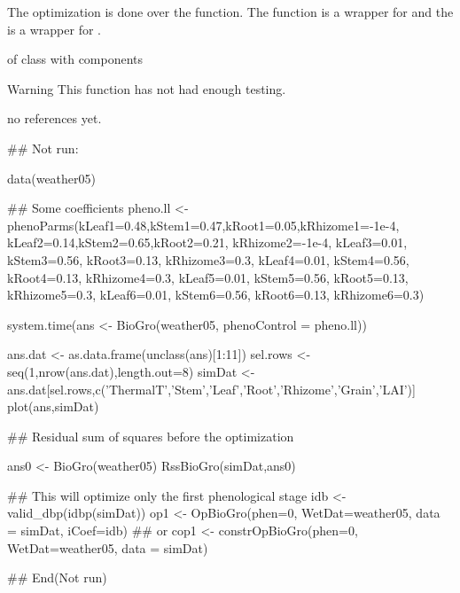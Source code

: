 \documentclass[letterpaper]{book}
\begin{document}
%
\begin{Details}\relax
The optimization is done over the 
function. The  function is a wrapper for
 and the  is a wrapper
for .
\end{Details}
%
\begin{Value}
 of class  with
components
\end{Value}
%
\begin{Section}{Warning}
This function has not had enough testing.
\end{Section}
%
\begin{References}\relax
no references yet.
\end{References}
%
\begin{SeeAlso}\relax
{} 
 
\end{SeeAlso}
%
\begin{Examples}
\begin{ExampleCode}
## Not run: 

data(weather05)

## Some coefficients
pheno.ll <- phenoParms(kLeaf1=0.48,kStem1=0.47,kRoot1=0.05,kRhizome1=-1e-4,
                       kLeaf2=0.14,kStem2=0.65,kRoot2=0.21, kRhizome2=-1e-4,
                       kLeaf3=0.01, kStem3=0.56, kRoot3=0.13, kRhizome3=0.3,
                       kLeaf4=0.01, kStem4=0.56, kRoot4=0.13, kRhizome4=0.3,
                       kLeaf5=0.01, kStem5=0.56, kRoot5=0.13, kRhizome5=0.3,
                       kLeaf6=0.01, kStem6=0.56, kRoot6=0.13, kRhizome6=0.3)

system.time(ans <- BioGro(weather05, phenoControl = pheno.ll))

ans.dat <- as.data.frame(unclass(ans)[1:11])
sel.rows <- seq(1,nrow(ans.dat),length.out=8)
simDat <- ans.dat[sel.rows,c('ThermalT','Stem','Leaf','Root','Rhizome','Grain','LAI')]
plot(ans,simDat)

## Residual sum of squares before the optimization

ans0 <- BioGro(weather05)
RssBioGro(simDat,ans0)

## This will optimize only the first phenological stage
idb <- valid_dbp(idbp(simDat))
op1 <- OpBioGro(phen=0, WetDat=weather05, data = simDat, iCoef=idb)
## or
cop1 <- constrOpBioGro(phen=0, WetDat=weather05, data = simDat)


## End(Not run)
\end{ExampleCode}
\end{Examples}
\end{document}
